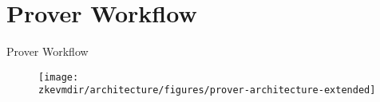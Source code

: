 
\section{Prover Workflow}
\begin{frame}{Prover Workflow}
\begin{figure}
\texttt{[image: \\zkevmdir/architecture/figures/prover-architecture-extended]}
\end{figure}
\end{frame}